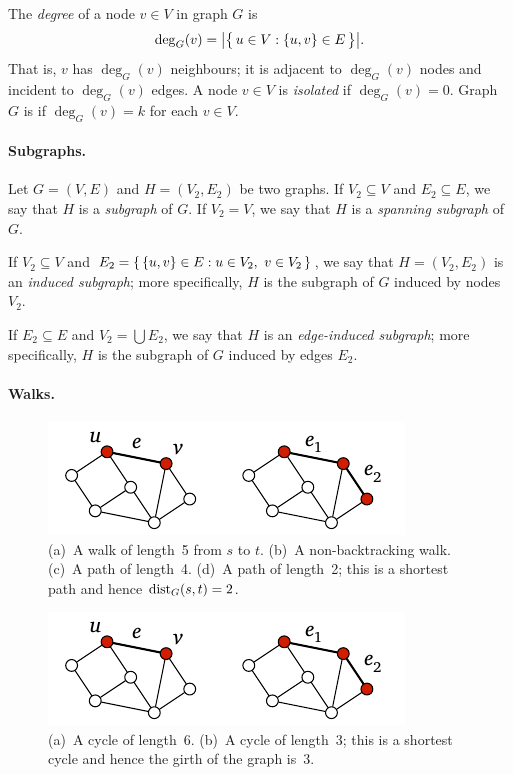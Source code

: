 The \emph{degree} of a node $v \in V$ in graph $G$ is \[
    \deg_G(v) = \bigl|\bigl\{\,  u \in V : \{u,v\} \in E  \,\bigr\}\bigr|.
\]
That is, $v$ has $\deg_G(v)$ neighbours; it is adjacent to $\deg_G(v)$ nodes and incident to $\deg_G(v)$ edges. A node $v \in V$ is \emph{isolated} if $\deg_G(v) = 0$. Graph $G$ is \emph{} if $\deg_G(v) = k$ for each $v \in V$.

\paragraph{Subgraphs.}

Let $G = (V,E)$ and $H = (V_2,E_2)$ be two graphs. If $V_2 \subseteq V$ and $E_2 \subseteq E$, we say that $H$ is a \emph{subgraph} of $G$. If $V_2 = V$, we say that $H$ is a \emph{spanning subgraph} of $G$.

If $V_2 \subseteq V$ and $E_2 = \{\,  \{u,v\} \in E : u \in V_2,\ v \in V_2  \,\}$, we say that $H = (V_2,E_2)$ is an \emph{induced subgraph}; more specifically, $H$ is the subgraph of $G$ induced by nodes $V_2$.

If $E_2 \subseteq E$ and $V_2 = \bigcup E_2$, we say that $H$ is an \emph{edge-induced subgraph}; more specifically, $H$ is the subgraph of $G$ induced by edges $E_2$.

\paragraph{Walks.}

\begin{figure}
    \centering
    \includegraphics[page=\PWalk]{figs.pdf}
    \caption{
        (a)~A walk of length~5 from $s$ to $t$.
        (b)~A non-backtracking walk.
        (c)~A path of length~4.
        (d)~A path of length~2; this is a shortest path and hence $\operatorname{dist}_G(s,t) = 2$.
    }\label{fig:walk}
\end{figure}

\begin{figure}
    \centering
    \includegraphics[page=\PCycle]{figs.pdf}
    \caption{
        (a)~A cycle of length~6.
        (b)~A cycle of length~3; this is a shortest cycle and hence the girth of the graph is~$3$.
    }\label{fig:cycle}
\end{figure}

